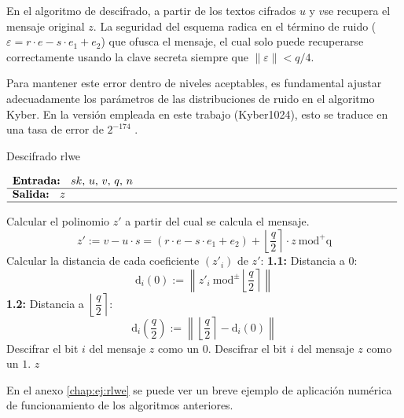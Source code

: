 En el algoritmo de descifrado, a partir de los textos cifrados \(u\) y \(v\)se recupera el mensaje original \(z\). La seguridad del esquema radica en el término de ruido ($\varepsilon=r\cdot e- s\cdot e_1 +e_2$) que ofusca el mensaje, el cual solo puede recuperarse correctamente usando la clave secreta siempre que \(\left\|\varepsilon\right\|< q/4\).
\newline

Para mantener este error dentro de niveles aceptables, es fundamental ajustar adecuadamente los parámetros de las distribuciones de ruido en el algoritmo Kyber. En la versión empleada en este trabajo (Kyber1024), esto se traduce en una tasa de error de $2^{-174}$ \cite{pqcrystalssecurity}.
\newpage
\begin{algorithm}[H]
	\caption{Descifrado \gls{rlwe} \protect\footnotemark[\value{footnote}]} 
	$\begin{array}{p{\textwidth}}
		\textbf{Entrada: } \(sk\), \(u\), \(v\), \(q\), \(n\)\\ 
		\hline
		\textbf{Salida: } \(z\)\\ 
		\hline
	\end{array}$
	\begin{algorithmic}[1]
		\State Calcular el polinomio \(z'\) a partir del cual se calcula el mensaje.
		\begin{equation}
			\label{eq:ruidoLWE}
			z':=v-u\cdot s = \left(r\cdot e- s\cdot e_1 +e_2\right)+\left\lfloor \dfrac{q}{2} \right\rceil \cdot z \ \text{mod}^{+}\text{q}
		\end{equation}
		\State Calcular la distancia de cada coeficiente \((z'_i)\) de \(z'\):
		\Statex \hspace{1em} \textbf{1.1:} Distancia a \(0\):
		\begin{equation}
			\text{d}_i(0):=\left\| z'_i \ \text{mod}^{\pm} \left\lfloor \dfrac{q}{2} \right\rceil \right\| 
		\end{equation} 
		\Statex \hspace{1em} \textbf{1.2:} Distancia a $\left\lfloor \dfrac{q}{2} \right\rceil$:
			\begin{equation}
			\text{d}_i\left(\dfrac{q}{2}\right):=\left\| \left\lfloor \dfrac{q}{2} \right\rceil - \text{d}_i(0)\right\| 
		\end{equation} 
			\Statex
			\State Descifrar el bit \(i\) del mensaje \(z\) como un \(0\).
		\Else
			\State Descifrar el bit \(i\) del mensaje \(z\) como un \(1\).
		\EndIf
		\State \Return \(z\)
	\end{algorithmic}
\end{algorithm}
 En el anexo \ref{chap:ej:rlwe} se puede ver un breve ejemplo de aplicación numérica de funcionamiento de los algoritmos anteriores.

